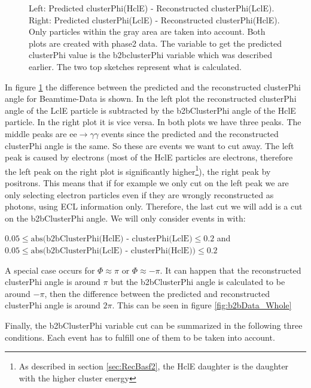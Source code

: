 \documentclass[a4paper,11pt,twosided,final,german,openbib,pdftex,listof=totoc,bibliography=totoc]{scrbook}
\begin{document}
\begin{figure}[h!]
\begin{minipage}[b]{\textwidth}
	\caption[b2bClusterPhi - clusterPhi For Beamtime-Data]{Left: Predicted clusterPhi(HclE) - Reconstructed clusterPhi(LclE). Right: Predicted clusterPhi(LclE) - Reconstructed clusterPhi(HclE). Only particles within the gray area are taken into account. Both plots are created with phase2 data. The variable to get the predicted clusterPhi value is the b2bclusterPhi variable which was described earlier. The two top sketches represent what is calculated.}
	\label{fig:b2bData}

\end{minipage}
\end{figure}


In figure \ref{fig:b2bData} the difference between the predicted and the reconstructed clusterPhi angle for Beamtime-Data is shown. In the left plot the reconstructed clusterPhi angle of the LclE particle is subtracted by the b2bClusterPhi angle of the HclE particle. In the right plot it is vice versa. In both plots we have three peaks. The middle peaks are $\textrm{ee} \rightarrow \gamma \gamma$ events since the predicted and the reconstructed clusterPhi angle is the same. So these are events we want to cut away. The left peak is caused by electrons (most of the HclE particles are electrons, therefore the left peak on the right plot is significantly higher\footnote{As described in section \ref{sec:RecBasf2}, the HclE daughter is the daughter with the higher cluster energy}), the right peak by positrons. This means that if for example we only cut on the left peak we are only selecting electron particles even if they are wrongly reconstructed as photons, using ECL information only. 
Therefore, the last cut we will add is a cut on the b2bClusterPhi angle. We will only consider events in with:
\newline

 $0.05 \leq \textrm{abs(b2bClusterPhi(HclE) - clusterPhi(LclE)} \leq 0.2 $ and  $0.05 \leq \textrm{abs(b2bClusterPhi(LclE) - clusterPhi(HclE))} \leq 0.2$
\newline

A special case occurs for $\Phi \approx \pi$ or $\Phi \approx -\pi$. It can happen that the reconstructed clusterPhi angle is around $\pi$ but the b2bClusterPhi angle is calculated to be around $-\pi$, then the difference between the predicted and reconstructed clusterPhi angle is around $2\pi$. This can be seen in figure \ref{fig:b2bData_Whole}

Finally, the b2bClusterPhi variable cut can be summarized in the following three conditions. Each event has to fulfill one of them to be taken into account.
\end{document}
